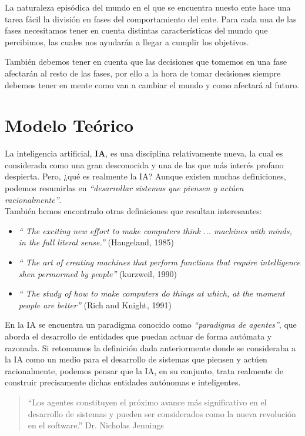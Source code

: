 \documentclass[a4paper,12pt,oneside]{book}
\begin{document}
La naturaleza episódica del mundo en el que se encuentra nuesto ente
hace una tarea fácil la división en fases del comportamiento del
ente. Para cada una de las fases necesitamos tener en cuenta distintas
características del mundo que percibimos, las cuales nos ayudarán a
llegar a cumplir los objetivos. 

También debemos tener en cuenta que
las decisiones que tomemos en una fase afectarán al resto de las
fases, por ello a la hora de tomar decisiones siempre debemos tener en
mente como van a cambiar el mundo  y como afectará al futuro.




\chapter{Modelo Teórico}
La inteligencia artificial, {\bf IA}, es una disciplina relativamente
nueva, la cual es considerada como una gran desconocida y una de las
que más interés profano despierta. Pero, {¿qué es realmente la IA?}
Aunque existen muchas definiciones, podemos resumirlas en {\it
  ``desarrollar sistemas que piensen y actúen racionalmente''}.\\

También hemos encontrado otras definiciones que resultan interesantes:
\begin{itemize}
\item {\it `` The exciting new effort to make computers think ... machines
    with minds, in the full literal sense.''} (Haugeland, 1985)\\
\item {\it `` The art of creating machines that perform functions that
    require intelligence shen permormed by people''} (kurzweil, 1990)\\
\item {\it `` The study of how to make computers do things at which, at the
    moment people are better''} (Rich and Knight, 1991)\\
\end{itemize}
En la IA se encuentra un paradigma conocido como {\it ``paradigma de
  agentes''}, que aborda el desarrollo de entidades que puedan actuar
de forma autómata y razonada. Si retomamos la definición dada
anteriormente donde se consideraba a la IA como un medio para el
desarrollo de sistemas que piensen y actúen racionalmente, podemos
pensar que la IA, en su conjunto, trata realmente de construir
precisamente dichas entidades autónomas e inteligentes.
\begin{quote}
  ``Los agentes constituyen el próximo avance más significativo en el
  desarrollo de sistemas y pueden ser considerados como la nueva
  revolución en el software.''
  Dr. Nicholas Jennings
\end{quote}
\end{document}
